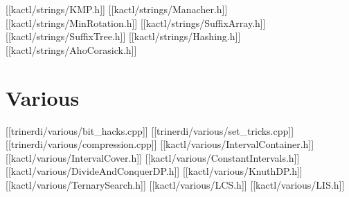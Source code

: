 [[kactl/strings/KMP.h]]
[[kactl/strings/Manacher.h]]
[[kactl/strings/MinRotation.h]]
[[kactl/strings/SuffixArray.h]]
[[kactl/strings/SuffixTree.h]]
[[kactl/strings/Hashing.h]]
[[kactl/strings/AhoCorasick.h]]

\chapter{Various}
[[trinerdi/various/bit_hacks.cpp]]
[[trinerdi/various/set_tricks.cpp]]
[[trinerdi/various/compression.cpp]]
[[kactl/various/IntervalContainer.h]]
[[kactl/various/IntervalCover.h]]
[[kactl/various/ConstantIntervals.h]]
[[kactl/various/DivideAndConquerDP.h]]
[[kactl/various/KnuthDP.h]]
[[kactl/various/TernarySearch.h]]
[[kactl/various/LCS.h]]
[[kactl/various/LIS.h]]

\singlecolumn
\bye
